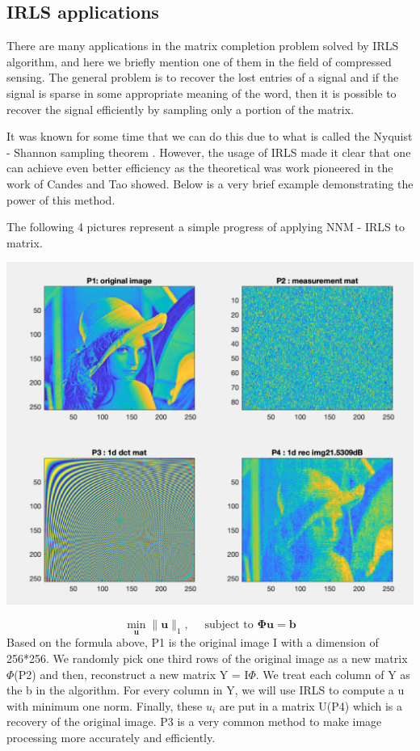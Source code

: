 \documentclass[12pt]{article}
\def \bu{\boldsymbol{u}}
\def \bb{\boldsymbol{b}}
\def \bb{\boldsymbol{b}}
\begin{document}
\subsection{IRLS applications}

There are many applications in the matrix completion problem solved by IRLS algorithm, and here we briefly mention one of them in the field of compressed sensing. The general problem is to recover the lost entries of a signal and if the signal is sparse in some appropriate meaning of the word, then it is possible to recover the signal efficiently by sampling only a portion of the matrix. 

It was known for some time that we can do this due to what is called the Nyquist - Shannon sampling theorem \cite{sample}. However, the usage of IRLS made it clear that one can achieve even better efficiency as the theoretical was work pioneered in the work of Candes and Tao  \cite{Candes-Tao} showed. Below is a very brief example demonstrating the power of this method. 

The following 4 pictures represent a simple progress of applying NNM - IRLS to matrix.

\includegraphics[width=1\textwidth]{lena1.png}

$$\min _{\bu}\|\bu\|_{1}, \quad \text { subject to } \boldsymbol{\Phi} \bu=\bb$$
Based on the formula above, P1 is the original image I with a dimension of 256*256. We randomly pick one third rows of the original image as a new matrix $\Phi$(P2) and then, reconstruct a new matrix Y = I$\Phi$. We treat each column of Y as the b in the algorithm. For every column in Y, we will use IRLS to compute a u with minimum one norm. Finally, these $u_{i}$ are put in a matrix U(P4) which is a recovery of the original image. \cite{IRLS Applications}
P3 is a very common method to make image processing more accurately and efficiently.
\end{document}
